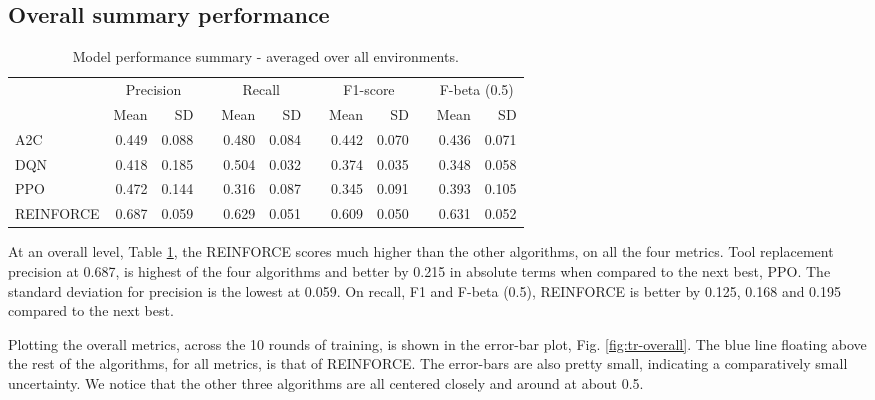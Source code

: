 \documentclass[a4paper, 12pt]{article}
\newcommand{\rowspace}[1]{\renewcommand{\arraystretch}{#1}}
\begin{document}
\subsection{Overall summary performance}
\begin{table}[!htb]\centering
	\sffamily
	\rowspace{1.3}
	\begin{tabular}{@{}l rr c rr c rr c rr@{}}
		\arrayrulecolor{black!40}\toprule
		& \multicolumn{2}{c}{Precision} & \phantom{i} & \multicolumn{2}{c}{Recall} & \phantom{i} & \multicolumn{2}{c}{F1-score} & \phantom{i} & \multicolumn{2}{c}{F-beta (0.5)} \\
		\cmidrule{2-3} \cmidrule{5-6} \cmidrule{8-9} \cmidrule{11-12} 
		
		&Mean &SD & &Mean &SD & &Mean &SD& &Mean & SD\\ \midrule
		
		A2C & 0.449 & 0.088 & &0.480 & 0.084 & & 0.442 & 0.070 & &0.436 &0.071 \\
		DQN & 0.418 & 0.185 & &0.504 & 0.032 & & 0.374 & 0.035 & &0.348 &0.058 \\
		PPO & 0.472 & 0.144 & &0.316 & 0.087 & & 0.345 & 0.091 & &0.393 &0.105 \\
		REINFORCE & 0.687 & 0.059 & &0.629 & 0.051 & & 0.609 & 0.050 & &0.631 &0.052 \\
		
		\bottomrule
	\end{tabular}
	\caption{Model performance summary - averaged over all environments.}
	\label{tbl:OverallSummary}
\end{table}
At an overall level, Table \ref{tbl:OverallSummary}, the REINFORCE scores much higher than the other algorithms, on all the four metrics. Tool replacement precision at 0.687, is highest of the four algorithms and better by 0.215 in absolute terms when compared to the next best, PPO. The standard deviation for precision is the lowest at 0.059. On recall, F1 and F-beta (0.5), REINFORCE is better by 0.125, 0.168 and 0.195 compared to the next best. 

Plotting the overall metrics, across the 10 rounds of training, is shown in the error-bar plot, Fig. \ref{fig:tr-overall}. The blue line floating above the rest of the algorithms, for all metrics, is that of REINFORCE. The error-bars are also pretty small, indicating a comparatively small uncertainty. We notice that the other three algorithms are all centered closely and around at about 0.5. 
\end{document}
